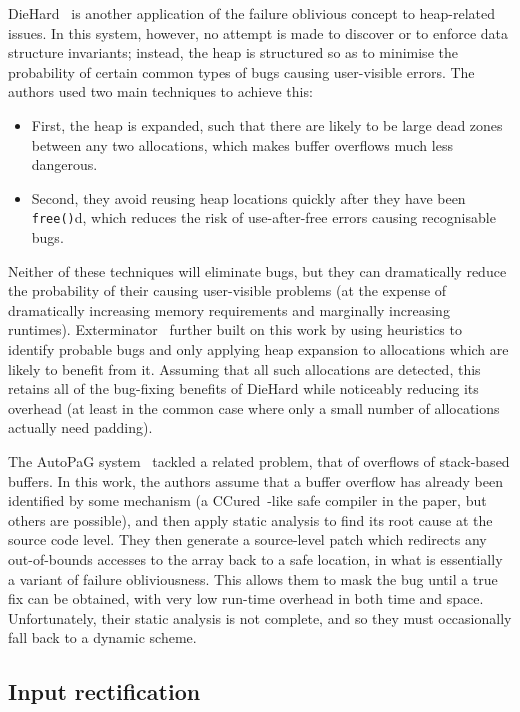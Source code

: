 DieHard~\cite{Berger2006} is another application of the failure
oblivious concept to heap-related issues.  In this system, however, no
attempt is made to discover or to enforce data structure invariants;
instead, the heap is structured so as to minimise the probability of
certain common types of bugs causing user-visible errors.  The authors
used two main techniques to achieve this:
\begin{itemize}
\item First, the heap is expanded, such that there are likely to be
  large dead zones between any two allocations, which makes buffer
  overflows much less dangerous.
\item Second, they avoid reusing heap locations quickly after they
  have been \texttt{free()}d, which reduces the risk of use-after-free
  errors causing recognisable bugs.
\end{itemize}
Neither of these techniques will eliminate bugs, but they can
dramatically reduce the probability of their causing user-visible
problems (at the expense of dramatically increasing memory
requirements and marginally increasing runtimes).
Exterminator~\cite{Novark2007} further built on this work by using
heuristics to identify probable bugs and only applying heap
expansion to allocations which are likely to benefit from it.
Assuming that all such allocations are detected, this retains all of
the bug-fixing benefits of DieHard while noticeably reducing its
overhead (at least in the common case where only a small number of
allocations actually need padding).

The AutoPaG system~\cite{Lin2007} tackled a related problem, that of
overflows of stack-based buffers.  In this work, the authors assume
that a buffer overflow has already been identified by some mechanism
(a CCured~\cite{Necula2005}-like safe compiler in the paper, but others
are possible), and then apply static analysis to find its root cause
at the source code level.  They then generate a source-level patch
which redirects any out-of-bounds accesses to the array back to a safe
location, in what is essentially a variant of failure obliviousness.
This allows them to mask the bug until a true fix can be obtained,
with very low run-time overhead in both time and space.
Unfortunately, their static analysis is not complete, and so they
must occasionally fall back to a dynamic scheme.

\subsection{Input rectification}

